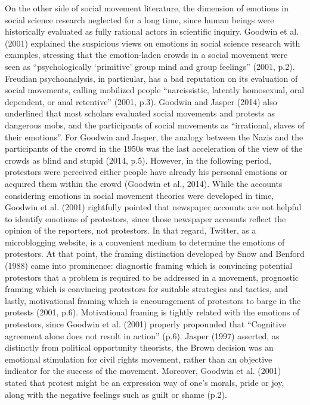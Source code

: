 \documentclass[a4paper]{article}
\begin{document}
On the other side of social movement literature, the dimension of emotions in social science research neglected for a long time, since human beings were historically evaluated as fully rational actors in scientific inquiry. Goodwin et al. (2001) explained the suspicious views on emotions in social science research with examples, stressing that the emotion-laden crowds in a social movement were seen as “psychologically ‘primitive’ group mind and group feelings” (2001, p.2). Freudian psychoanalysis, in particular, has a bad reputation on its evaluation of social movements, calling mobilized people “narcissistic, latently homosexual, oral dependent, or anal retentive” (2001, p.3). Goodwin and Jasper (2014) also underlined that most scholars evaluated social movements and protests as dangerous mobs, and the participants of social movements as “irrational, slaves of their emotions”. For Goodwin and Jasper, the analogy between the Nazis and the participants of the crowd in the 1950s was the last acceleration of the view of the crowds as blind and stupid (2014, p.5). However, in the following period, protestors were perceived either people have already his personal emotions or acquired them within the crowd (Goodwin et al., 2014). While the accounts considering emotions in social movement theories were developed in time, Goodwin et al. (2001) rightfully pointed that newspaper accounts are not helpful to identify emotions of protestors, since those newspaper accounts reflect the opinion of the reporters, not protestors. In that regard, Twitter, as a microblogging website, is a convenient medium to determine the emotions of protestors. At that point, the framing distinction developed by Snow and Benford (1988) came into prominence: diagnostic framing which is convincing potential protestors that a problem is required to be addressed in a movement, prognostic framing which is convincing protestors for suitable strategies and tactics, and lastly, motivational framing which is encouragement of protestors to barge in the protests (2001, p.6). Motivational framing is tightly related with the emotions of protestors, since Goodwin et al. (2001) properly propounded that “Cognitive agreement alone does not result in action” (p.6). Jasper (1997) asserted, as distinctly from political opportunity theorists, the Brown decision was an emotional stimulation for civil rights movement, rather than an objective indicator for the success of the movement. Moreover, Goodwin et al. (2001) stated that protest might be an expression way of one’s morals, pride or joy, along with the negative feelings such as guilt or shame (p.2). \\ 
\end{document}
